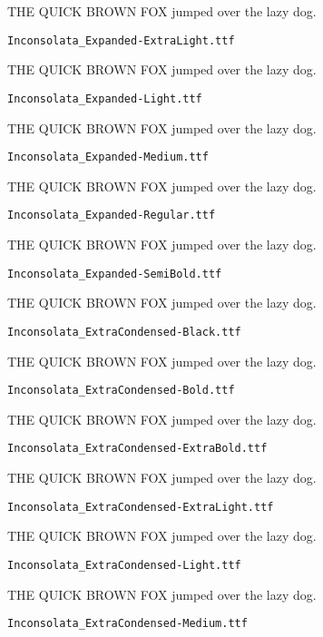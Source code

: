 \documentclass{article}
\begin{document}
THE QUICK BROWN FOX jumped over the lazy dog.

\setmainfont[Extension=.ttf]{Inconsolata_Expanded-ExtraLight}
\noindent \verb!Inconsolata_Expanded-ExtraLight.ttf!

THE QUICK BROWN FOX jumped over the lazy dog.

\setmainfont[Extension=.ttf]{Inconsolata_Expanded-Light}
\noindent \verb!Inconsolata_Expanded-Light.ttf!

THE QUICK BROWN FOX jumped over the lazy dog.

\setmainfont[Extension=.ttf]{Inconsolata_Expanded-Medium}
\noindent \verb!Inconsolata_Expanded-Medium.ttf!

THE QUICK BROWN FOX jumped over the lazy dog.

\setmainfont[Extension=.ttf]{Inconsolata_Expanded-Regular}
\noindent \verb!Inconsolata_Expanded-Regular.ttf!

THE QUICK BROWN FOX jumped over the lazy dog.

\setmainfont[Extension=.ttf]{Inconsolata_Expanded-SemiBold}
\noindent \verb!Inconsolata_Expanded-SemiBold.ttf!

THE QUICK BROWN FOX jumped over the lazy dog.

\setmainfont[Extension=.ttf]{Inconsolata_ExtraCondensed-Black}
\noindent \verb!Inconsolata_ExtraCondensed-Black.ttf!

THE QUICK BROWN FOX jumped over the lazy dog.

\setmainfont[Extension=.ttf]{Inconsolata_ExtraCondensed-Bold}
\noindent \verb!Inconsolata_ExtraCondensed-Bold.ttf!

THE QUICK BROWN FOX jumped over the lazy dog.

\setmainfont[Extension=.ttf]{Inconsolata_ExtraCondensed-ExtraBold}
\noindent \verb!Inconsolata_ExtraCondensed-ExtraBold.ttf!

THE QUICK BROWN FOX jumped over the lazy dog.

\setmainfont[Extension=.ttf]{Inconsolata_ExtraCondensed-ExtraLight}
\noindent \verb!Inconsolata_ExtraCondensed-ExtraLight.ttf!

THE QUICK BROWN FOX jumped over the lazy dog.

\setmainfont[Extension=.ttf]{Inconsolata_ExtraCondensed-Light}
\noindent \verb!Inconsolata_ExtraCondensed-Light.ttf!

THE QUICK BROWN FOX jumped over the lazy dog.

\setmainfont[Extension=.ttf]{Inconsolata_ExtraCondensed-Medium}
\noindent \verb!Inconsolata_ExtraCondensed-Medium.ttf!
\end{document}
